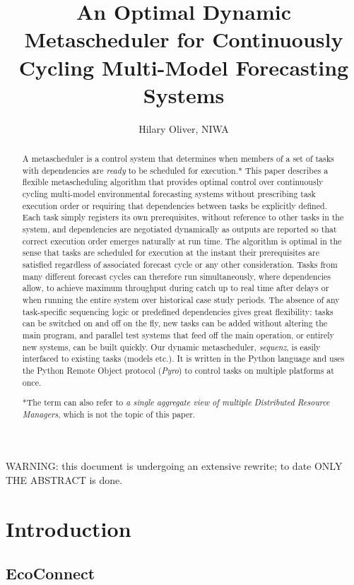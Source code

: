 \documentclass[11pt,a4paper]{article}
\title{An Optimal Dynamic Metascheduler for Continuously Cycling
Multi-Model Forecasting Systems}
\author{Hilary Oliver, NIWA}
\begin{document}
\maketitle
\tableofcontents

{\huge WARNING: this document is undergoing an extensive rewrite; to
date ONLY THE ABSTRACT is done.}

\begin{abstract}
A metascheduler is a control system that determines when members of a
set of tasks with dependencies are {\em ready} to be scheduled for
execution.* This paper describes a flexible metascheduling algorithm
that provides optimal control over continuously cycling multi-model
environmental forecasting systems without prescribing task execution
order or requiring that dependencies between tasks be explicitly
defined. Each task simply registers its own prerequisites, without
reference to other tasks in the system, and dependencies are negotiated
dynamically as outputs are reported so that correct execution order
emerges naturally at run time.  The algorithm is optimal in the sense
that tasks are scheduled for execution at the instant their
prerequisites are satisfied regardless of associated forecast cycle or
any other consideration. Tasks from many different forecast cycles can
therefore run simultaneously, where dependencies allow, to achieve
maximum throughput during catch up to real time after delays or when
running the entire system over historical case study periods. The
absence of any task-specific sequencing logic or predefined dependencies
gives great flexibility: tasks can be switched on and off on the fly,
new tasks can be added without altering the main program, and parallel
test systems that feed off the main operation, or entirely new systems,
can be built quickly.  Our dynamic metascheduler, {\em sequenz}, is
easily interfaced to existing tasks (models etc.). It is written in the
Python language and uses the Python Remote Object protocol ({\em Pyro})
to control tasks on multiple platforms at once. 

*The term can also refer to {\it a single aggregate view of multiple
Distributed Resource Managers}, which is not the topic of this paper.

\end{abstract}
\section{Introduction}

\subsection{EcoConnect}
\end{document}

